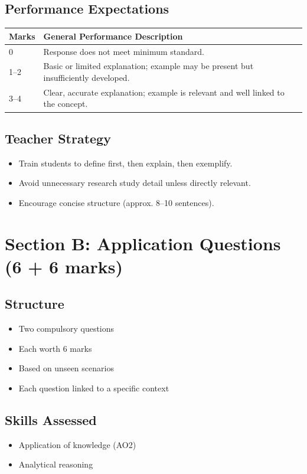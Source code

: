 \documentclass[12pt,a4paper]{article}
\begin{document}
\subsection*{Performance Expectations}

\begin{longtable}{p{1.5cm} p{12cm}}
\toprule
\textbf{Marks} & \textbf{General Performance Description} \\
\midrule
0 & Response does not meet minimum standard. \\
1--2 & Basic or limited explanation; example may be present but insufficiently developed. \\
3--4 & Clear, accurate explanation; example is relevant and well linked to the concept. \\
\bottomrule
\end{longtable}

\subsection*{Teacher Strategy}
\begin{itemize}
    \item Train students to define first, then explain, then exemplify.
    \item Avoid unnecessary research study detail unless directly relevant.
    \item Encourage concise structure (approx. 8–10 sentences).
\end{itemize}

\newpage

\section{Section B: Application Questions (6 + 6 marks)}

\subsection*{Structure}
\begin{itemize}
    \item Two compulsory questions
    \item Each worth 6 marks
    \item Based on unseen scenarios
    \item Each question linked to a specific context
\end{itemize}

\subsection*{Skills Assessed}
\begin{itemize}
    \item Application of knowledge (AO2)
    \item Analytical reasoning
\end{itemize}
\end{document}
